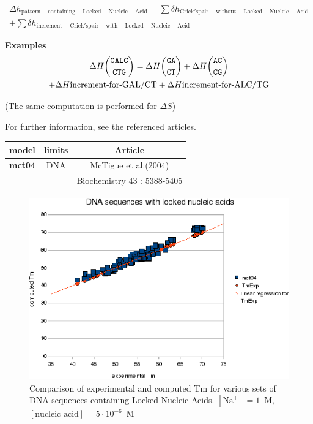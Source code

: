 \documentclass{article}
\begin{document}
\begin{multline*}
\Delta{}h_\mathrm{pattern-containing-Locked-Nucleic-Acid} =
\sum \delta{}h_\mathrm{Crick's pair-without-Locked-Nucleic-Acid} \\ +
\sum \delta{}h_\mathrm{increment-Crick's pair-with-Locked-Nucleic-Acid}
\end{multline*}

\textbf{Examples}
\begin{multline*}
\Delta H {\mbox{\texttt{GALC}} \choose \mbox{\texttt{CTG}}} = 
\Delta H {\mbox{\texttt{GA}} \choose \mbox{\texttt{CT}}} +
\Delta H {\mbox{\texttt{AC}} \choose \mbox{\texttt{CG}}} \\ +
\Delta H {\mbox{increment-for-GAL/CT}} +
\Delta H {\mbox{increment-for-ALC/TG}}\\
\end{multline*}

       (The same computation is performed for $\Delta S$) 
       
For further information, see the referenced articles.

\begin{table}[h][c]
\begin{tabular}[h]{| c | c | c |}
\textbf{model} & \textbf{limits} & \textbf{Article} \\
\hline
\textbf{mct04} & DNA & McTigue et al.(2004)\\
 & & Biochemistry 43 : 5388-5405\\
\hline
\end{tabular}
\end{table}

\begin{figure}[h]
\includegraphics[width=1\linewidth]{images/LockedNucleicAcid}
\caption{Comparison of experimental and computed Tm for various sets of
 DNA sequences containing Locked Nucleic Acids. $[\mbox{Na}^+] = 1$~M, $[\mbox{nucleic acid}] = 5\cdot{}10^{-6}$~M}
\end{figure}
      
\end{document}
